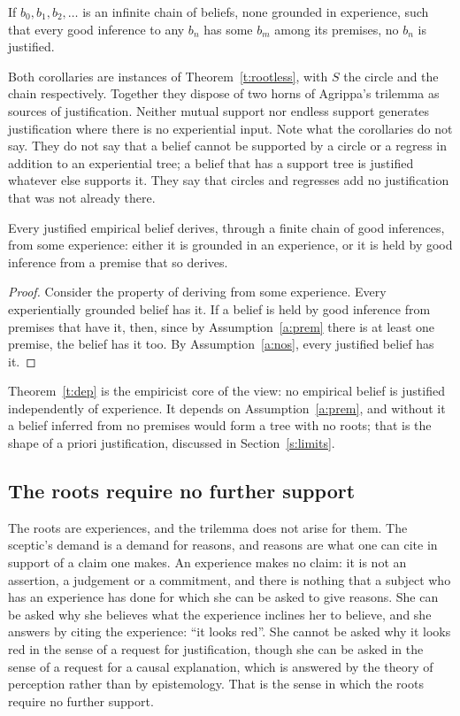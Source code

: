 \documentclass{situationist-preprint}
\begin{document}
\begin{corollary}[Regresses]\label{c:regress}
If $b_0, b_1, b_2, \ldots$ is an infinite chain of beliefs, none grounded in experience, such that every good inference to any $b_n$ has some $b_m$ among its premises, no $b_n$ is justified.
\end{corollary}

Both corollaries are instances of Theorem~\ref{t:rootless}, with $S$ the circle and the chain respectively. Together they dispose of two horns of Agrippa's trilemma as sources of justification. Neither mutual support nor endless support generates justification where there is no experiential input. Note what the corollaries do not say. They do not say that a belief cannot be supported by a circle or a regress in addition to an experiential tree; a belief that has a support tree is justified whatever else supports it. They say that circles and regresses add no justification that was not already there.

\begin{theorem}\label{t:dep}
Every justified empirical belief derives, through a finite chain of good inferences, from some experience: either it is grounded in an experience, or it is held by good inference from a premise that so derives.
\end{theorem}

\begin{proof}
Consider the property of deriving from some experience. Every experientially grounded belief has it. If a belief is held by good inference from premises that have it, then, since by Assumption~\ref{a:prem} there is at least one premise, the belief has it too. By Assumption~\ref{a:nos}, every justified belief has it.
\end{proof}

Theorem~\ref{t:dep} is the empiricist core of the view: no empirical belief is justified independently of experience. It depends on Assumption~\ref{a:prem}, and without it a belief inferred from no premises would form a tree with no roots; that is the shape of a priori justification, discussed in Section~\ref{s:limits}.

\subsection{The roots require no further support}

The roots are experiences, and the trilemma does not arise for them. The sceptic's demand is a demand for reasons, and reasons are what one can cite in support of a claim one makes. An experience makes no claim: it is not an assertion, a judgement or a commitment, and there is nothing that a subject who has an experience has done for which she can be asked to give reasons. She can be asked why she believes what the experience inclines her to believe, and she answers by citing the experience: \enquote{it looks red}. She cannot be asked why it looks red in the sense of a request for justification, though she can be asked in the sense of a request for a causal explanation, which is answered by the theory of perception rather than by epistemology. That is the sense in which the roots require no further support.
\end{document}
